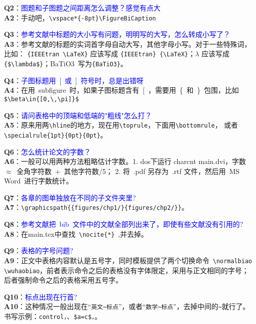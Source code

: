 \noindent \textbf{Q2}：\textcolor{blue}{图题和子图题之间距离怎么调整？感觉有点大}\\
\textbf{A2}：手动吧，\verb+\vspace*{-8pt}\FigureBiCaption+

\noindent \textbf{Q3}：\textcolor{blue}{参考文献中标题的大小写有问题，明明写的大写，怎么转成小写了？}\\
\textbf{A3}：参考文献的标题的实词首字母自动大写，其他字母小写。对于一些特殊词，比如：
\verb+{IEEEtran \LaTeX}+ 应该写成 \verb+{IEEEtran} {\LaTeX}+；$\lambda$ 应该写成
\verb+{$\lambda$}+；BaTiO3~写为\verb+{BaTiO3}+。

\noindent \textbf{Q4}：\textcolor{blue}{子图标题用~[~或~]~符号时，总是出错呀}\\
\textbf{A4}：在用~subfigure~时，如果子图标题含有~[~，需要用~\{~和~\}~包围，比如
\verb+$\beta\in{[0,\,\pi]}$+

\noindent \textbf{Q5}：\textcolor{blue}{请问表格中的顶端和低端的"粗线"怎么打？}\\
\textbf{A5}：原来用两\verb+\hline+的地方，现在用\verb+\toprule+，下面用\verb+\bottomrule+，
或者\verb+\specialrule{1pt}{0pt}{0pt}+。

\noindent \textbf{Q6}：\textcolor{blue}{怎么统计论文的字数？}\\
\textbf{A6}：一般可以用两种方法粗略估计字数。1. dos下运行 charcnt main.dvi，字数~$\approx$~全角字符数~+~其他字符数/5；
2. 将~.pdf 另存为~.rtf 文件，然后用~MS Word~进行字数统计。

\noindent \textbf{Q7}：\textcolor{blue}{各章的图单独放在不同的子文件夹里?}\\
\textbf{A7}：\verb+\graphicspath{{figures/chp1/}{figures/chp2/}}+。

\noindent \textbf{Q8}：\textcolor{blue}{参考文献把~bib~文件中的文献全部列出来了，即使有些文献没有引用的?}\\
\textbf{A8}：在main.tex中查找~\verb+\nocite{*}+~,并去掉。

\noindent \textbf{Q9}：\textcolor{blue}{表格的字号问题?}\\
\textbf{A9}：正文中表格内容默认是五号字，同时模板提供了两个切换命令~\verb+\normalbiao \wuhaobiao+，前者表示命令之后的表格没有字体限定，采用与正文相同的字号；后者强制命令之后的表格采用五号字。

\noindent \textbf{Q10}：\textcolor{blue}{标点出现在行首?}\\
\textbf{A10}：这种情况一般出现在“\verb+英文~标点+”，或者“\verb+数学~标点+”，去掉中间的\verb+~+就行了。书写示例：\verb+control，+、\verb+$a=c$，+。

